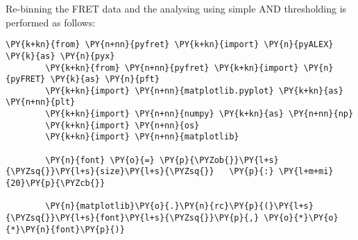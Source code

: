 Re-binning the FRET data and the analysing using simple AND thresholding is performed as follows:

\begin{Verbatim}[commandchars=\\\{\}, fontsize=\scriptsize]
        \PY{k+kn}{from} \PY{n+nn}{pyfret} \PY{k+kn}{import} \PY{n}{pyALEX} \PY{k}{as} \PY{n}{pyx}
        \PY{k+kn}{from} \PY{n+nn}{pyfret} \PY{k+kn}{import} \PY{n}{pyFRET} \PY{k}{as} \PY{n}{pft}
        \PY{k+kn}{import} \PY{n+nn}{matplotlib.pyplot} \PY{k+kn}{as} \PY{n+nn}{plt}
        \PY{k+kn}{import} \PY{n+nn}{numpy} \PY{k+kn}{as} \PY{n+nn}{np}
        \PY{k+kn}{import} \PY{n+nn}{os}
        \PY{k+kn}{import} \PY{n+nn}{matplotlib}
        
        \PY{n}{font} \PY{o}{=} \PY{p}{\PYZob{}}\PY{l+s}{\PYZsq{}}\PY{l+s}{size}\PY{l+s}{\PYZsq{}}   \PY{p}{:} \PY{l+m+mi}{20}\PY{p}{\PYZcb{}}
        
        \PY{n}{matplotlib}\PY{o}{.}\PY{n}{rc}\PY{p}{(}\PY{l+s}{\PYZsq{}}\PY{l+s}{font}\PY{l+s}{\PYZsq{}}\PY{p}{,} \PY{o}{*}\PY{o}{*}\PY{n}{font}\PY{p}{)}


\end{Verbatim}
